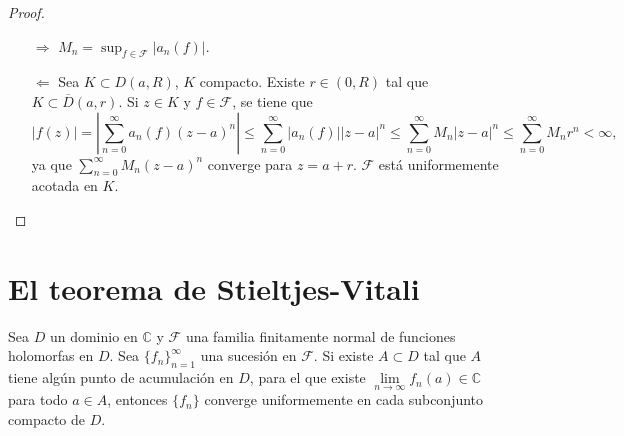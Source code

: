 \begin{proof}
    \hfill
    \begin{itemize}
        \item[$\boxed{\Rightarrow}$] $M_n = \sup_{f \in \mathcal{F}} |a_n(f)|$.
        \item[$\boxed{\Leftarrow}$] Sea $K \subset D(a, R)$, $K$ compacto.
            Existe $r \in (0, R)$ tal que $K \subset \overline{D}(a, r)$.
            Si $z \in K$ y $f \in \mathcal{F}$, se tiene que
            $$|f(z)| = \left|\sum_{n=0}^\infty a_n(f)(z-a)^n\right| \leq \sum_{n=0}^\infty |a_n(f)||z-a|^n \leq \sum_{n=0}^\infty M_n|z-a|^n \leq \sum_{n=0}^\infty M_nr^n < \infty,$$
            ya que $\sum_{n=0}^\infty M_n(z-a)^n$ converge para $z = a+r$.
            $\mathcal{F}$ está uniformemente acotada en $K$.
    \end{itemize}
\end{proof}

\section{El teorema de Stieltjes-Vitali}
\begin{theorem}
    Sea $D$ un dominio en $\mathbb{C}$ y $\mathcal{F}$ una familia finitamente normal de funciones holomorfas en $D$.
    Sea $\{f_n\}_{n=1}^\infty$ una sucesión en $\mathcal{F}$.
    Si existe $A \subset D$ tal que $A$ tiene algún punto de acumulación en $D$, para el que existe $\lim\limits_{n \to \infty} f_n(a) \in \mathbb{C}$ para todo $a \in A$, entonces $\{f_n\}$ converge uniformemente en cada subconjunto compacto de $D$.
\end{theorem}


